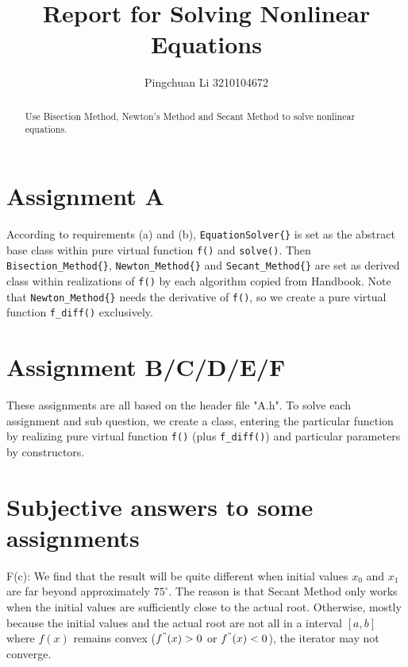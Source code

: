 \documentclass{article}
\title{Report for Solving Nonlinear Equations}
\author{Pingchuan Li 3210104672}
\begin{document}
\maketitle

\begin{abstract}
Use Bisection Method, Newton's Method and Secant Method to solve nonlinear equations.
\end{abstract}

\section{Assignment A}

According to requirements (a) and (b), \verb|EquationSolver{}| is set as the abstract base class within pure virtual function \verb|f()| and \verb|solve()|. Then \verb|Bisection_Method{}|, \verb|Newton_Method{}| and \verb|Secant_Method{}| are set as derived class within realizations of \verb|f()| by each algorithm copied from Handbook. Note that \verb|Newton_Method{}| needs the derivative of \verb|f()|, so we create a pure virtual function \verb|f_diff()| exclusively.

\section{Assignment B/C/D/E/F}

These assignments are all based on the header file "A.h". To solve each assignment and sub question, we create a class, entering the particular function by realizing pure virtual function \verb|f()| (plus \verb|f_diff()|) and particular parameters by constructors.

\section{Subjective answers to some assignments}
F(c): We find that the result will be quite different when initial values $x_0$ and $x_1$ are far beyond approximately $75^\circ$. The reason is that Secant Method only works when the initial values are sufficiently close to the actual root. Otherwise, mostly because the initial values and the actual root are not all in a interval $[a,b]$ where $f(x)$ remains convex ($f^{"}(x)>0$ or $f^{"}(x)<0$), the iterator may not converge.
\end{document}
